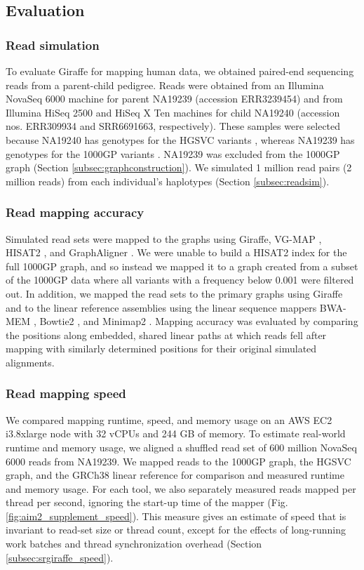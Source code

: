 \documentclass[11pt]{ucscthesis}
\begin{document}
\subsection{Evaluation}
\subsubsection{Read simulation}
To evaluate Giraffe for mapping human data, we obtained paired-end sequencing reads from a parent-child pedigree.
Reads were obtained from an Illumina NovaSeq 6000 machine for parent NA19239 (accession ERR3239454) and from Illumina HiSeq 2500 and HiSeq X Ten machines for child NA19240 (accession nos. ERR309934 and SRR6691663, respectively).
These samples were selected because NA19240 has genotypes for the HGSVC variants \cite{chaisson_sv_2019}, whereas NA19239 has genotypes for the 1000GP variants \cite{1000gp_2015}.
NA19239 was excluded from the 1000GP graph (Section \ref{subsec:graphconstruction}).
We simulated 1 million read pairs (2 million reads) from each individual’s haplotypes (Section \ref{subsec:readsim}).

\subsubsection{Read mapping accuracy}
Simulated read sets were mapped to the graphs using Giraffe, VG-MAP \cite{garrison_variation_2018}, HISAT2 \cite{kim_hisat2_2019}, and GraphAligner \cite{rautiainen_graphaligner_2020}.
We were unable to build a HISAT2 index for the full 1000GP graph, and so instead we mapped it to a graph created from a subset of the 1000GP data where all variants with a frequency below 0.001 were filtered out.
In addition, we mapped the read sets to the primary graphs using Giraffe and to the linear reference assemblies using the linear sequence mappers BWA-MEM \cite{li_bwa_mem_2013}, Bowtie2 \cite{langmead_bowtie2_2012}, and Minimap2 \cite{li_minimap2_2018}.
Mapping accuracy was evaluated by comparing the positions along embedded, shared linear paths at which reads fell after mapping with similarly determined positions for their original simulated alignments.

\subsubsection{Read mapping speed}
We compared mapping runtime, speed, and memory usage on an AWS EC2 i3.8xlarge node with 32 vCPUs and 244 GB of memory.
To estimate real-world runtime and memory usage, we aligned a shuffled read set of 600 million NovaSeq 6000 reads from NA19239.
We mapped reads to the 1000GP graph, the HGSVC graph, and the GRCh38 linear reference for comparison and measured runtime and memory usage.
For each tool, we also separately measured reads mapped per thread per second, ignoring the start-up time of the mapper (Fig.\ref*{fig:aim2_supplement_speed}).
This measure gives an estimate of speed that is invariant to read-set size or thread count, except for the effects of long-running work batches and thread synchronization overhead (Section \ref{subsec:srgiraffe_speed}).
\end{document}
